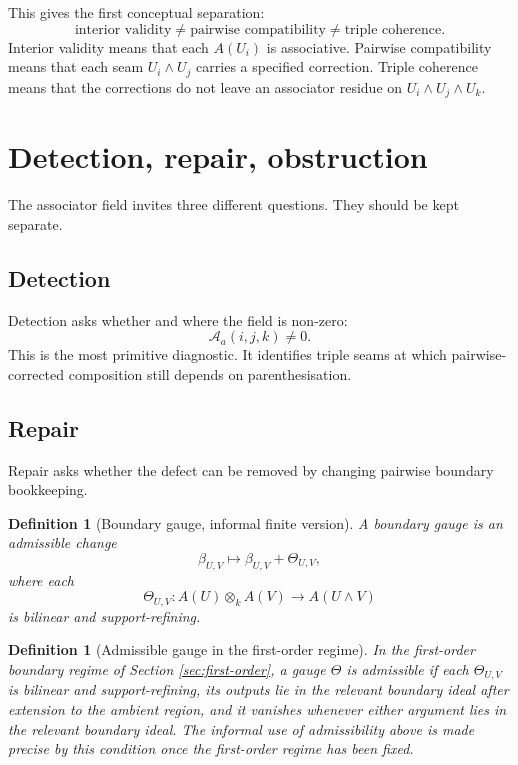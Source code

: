 \documentclass[11pt]{article}
\newtheorem{definition}[theorem]{Definition}
\begin{document}
This gives the first conceptual separation:
\[
\text{interior validity}\neq \text{pairwise compatibility}\neq \text{triple coherence}.
\]
Interior validity means that each \(A(U_i)\) is associative. Pairwise compatibility means that each seam \(U_i\wedge U_j\) carries a specified correction. Triple coherence means that the corrections do not leave an associator residue on \(U_i\wedge U_j\wedge U_k\).

\section{Detection, repair, obstruction}

The associator field invites three different questions. They should be kept separate.

\subsection{Detection}

Detection asks whether and where the field is non-zero:
\[
\mathcal A_a(i,j,k)\neq 0.
\]
This is the most primitive diagnostic. It identifies triple seams at which pairwise-corrected composition still depends on parenthesisation.

\subsection{Repair}

Repair asks whether the defect can be removed by changing pairwise boundary bookkeeping.

\begin{definition}[Boundary gauge, informal finite version]
A boundary gauge is an admissible change
\[
\beta_{U,V}\longmapsto \beta_{U,V}+\Theta_{U,V},
\]
where each
\[
\Theta_{U,V}:A(U)\otimes_k A(V)\to A(U\wedge V)
\]
is bilinear and support-refining.
\end{definition}

\begin{definition}[Admissible gauge in the first-order regime]
In the first-order boundary regime of Section \ref{sec:first-order}, a gauge \(\Theta\) is admissible if each \(\Theta_{U,V}\) is bilinear and support-refining, its outputs lie in the relevant boundary ideal after extension to the ambient region, and it vanishes whenever either argument lies in the relevant boundary ideal. The informal use of admissibility above is made precise by this condition once the first-order regime has been fixed.
\end{definition}
\end{document}
